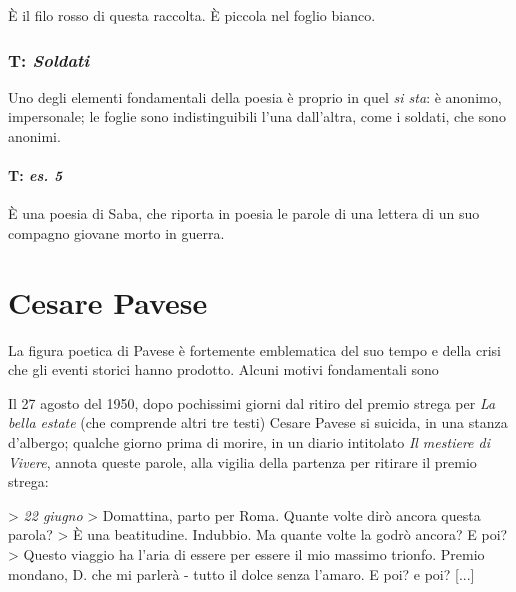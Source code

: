 È il filo rosso di questa raccolta. È piccola nel foglio bianco.

\subsection{T: \textit{Soldati}}

Uno degli elementi fondamentali della poesia è proprio in quel \textit{si sta}: è anonimo, impersonale; le foglie sono indistinguibili l'una dall'altra, come i soldati, che sono anonimi.

\subsubsection{T: \textit{es. 5}}

È una poesia di Saba, che riporta in poesia le parole di una lettera di un suo compagno giovane morto in guerra.

\chapter{Cesare Pavese}

La figura poetica di Pavese è fortemente emblematica del suo tempo e della crisi che gli eventi storici hanno prodotto. Alcuni motivi fondamentali sono

Il 27 agosto del 1950, dopo pochissimi giorni dal ritiro del premio strega per \textit{La bella estate} (che comprende altri tre testi) Cesare Pavese si suicida, in una stanza d'albergo; qualche giorno prima di morire, in un diario intitolato \textit{Il mestiere di Vivere}, annota queste parole, alla vigilia della partenza per ritirare il premio strega:

> \textit{22 giugno}
> Domattina, parto per Roma. Quante volte dirò ancora questa parola?
> È una beatitudine. Indubbio. Ma quante volte la godrò ancora? E poi?
> Questo viaggio ha l'aria di essere per essere il mio massimo trionfo. Premio mondano, D. che mi parlerà - tutto il dolce senza l'amaro. E poi? e poi? [...]

